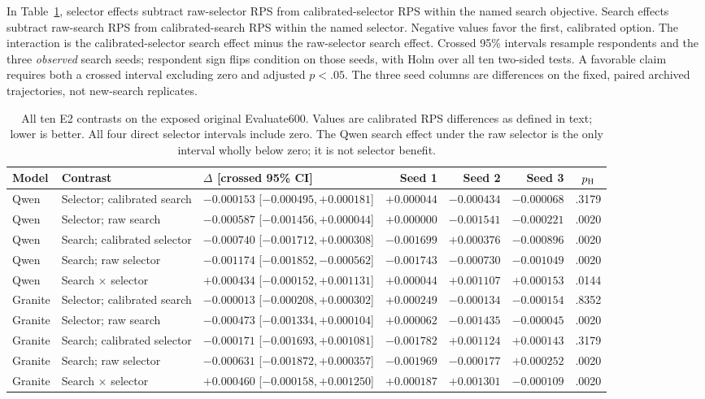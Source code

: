 \documentclass[sigconf,anonymous]{aamas}
\begin{document}
In Table~\ref{tab:e2-contrasts}, selector effects subtract raw-selector RPS
from calibrated-selector RPS within the named search objective. Search effects
subtract raw-search RPS from calibrated-search RPS within the named selector.
Negative values favor the first, calibrated option. The interaction is the
calibrated-selector search effect minus the raw-selector search effect.
Crossed 95\% intervals resample respondents and the three \emph{observed}
search seeds; respondent sign flips condition on those seeds, with Holm over
all ten two-sided tests. A favorable claim requires both a crossed interval
excluding zero and adjusted $p<.05$. The three seed columns are differences
on the fixed, paired archived trajectories, not new-search replicates.

\begin{table}[H]\centering\scriptsize\setlength{\tabcolsep}{3pt}
\caption{All ten E2 contrasts on the exposed original Evaluate600. Values are
calibrated RPS differences as defined in text; lower is better. All four
direct selector intervals include zero. The Qwen search effect under the raw
selector is the only interval wholly below zero; it is not selector benefit.}
\label{tab:e2-contrasts}
\begin{tabular}{@{}lp{}lrrrc@{}}\toprule
Model & Contrast & $\Delta$ [crossed 95\% CI] & Seed 1 & Seed 2 & Seed 3 & $p_{\rm H}$\\\midrule
Qwen & Selector; calibrated search & $-0.000153$ [$-0.000495,+0.000181$] & $+0.000044$ & $-0.000434$ & $-0.000068$ & .3179\\
Qwen & Selector; raw search & $-0.000587$ [$-0.001456,+0.000044$] & $+0.000000$ & $-0.001541$ & $-0.000221$ & .0020\\
Qwen & Search; calibrated selector & $-0.000740$ [$-0.001712,+0.000308$] & $-0.001699$ & $+0.000376$ & $-0.000896$ & .0020\\
Qwen & Search; raw selector & $-0.001174$ [$-0.001852,-0.000562$] & $-0.001743$ & $-0.000730$ & $-0.001049$ & .0020\\
Qwen & Search $\times$ selector & $+0.000434$ [$-0.000152,+0.001131$] & $+0.000044$ & $+0.001107$ & $+0.000153$ & .0144\\\midrule
Granite & Selector; calibrated search & $-0.000013$ [$-0.000208,+0.000302$] & $+0.000249$ & $-0.000134$ & $-0.000154$ & .8352\\
Granite & Selector; raw search & $-0.000473$ [$-0.001334,+0.000104$] & $+0.000062$ & $-0.001435$ & $-0.000045$ & .0020\\
Granite & Search; calibrated selector & $-0.000171$ [$-0.001693,+0.001081$] & $-0.001782$ & $+0.001124$ & $+0.000143$ & .3179\\
Granite & Search; raw selector & $-0.000631$ [$-0.001872,+0.000357$] & $-0.001969$ & $-0.000177$ & $+0.000252$ & .0020\\
Granite & Search $\times$ selector & $+0.000460$ [$-0.000158,+0.001250$] & $+0.000187$ & $+0.001301$ & $-0.000109$ & .0020\\\bottomrule
\end{tabular}\end{table}
\end{document}
